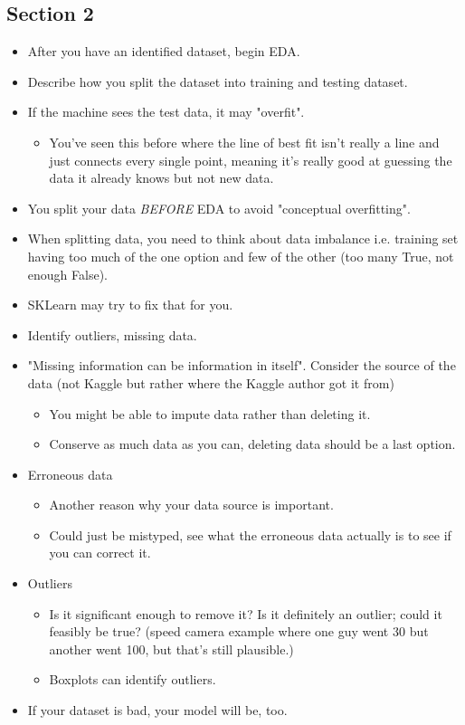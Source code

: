 \documentclass[12pt]{report}
\begin{document}
\subsection{Section 2}
\begin{itemize}
    \item After you have an identified dataset, begin EDA.
    \item Describe how you split the dataset into training and testing dataset.
    \item If the machine sees the test data, it may "overfit". \begin{itemize}
        \item You've seen this before where the line of best fit isn't really a line and just connects every single point, meaning it's 
        really good at guessing the data it already knows but not new data. 
    \end{itemize}
    \item You split your data \textit{BEFORE} EDA to avoid "conceptual overfitting".
    \item When splitting data, you need to think about data imbalance i.e. training set having too much of the one option and few of the other (too many True, not enough False).
    \item SKLearn may try to fix that for you.
    \item Identify outliers, missing data.
    \item "Missing information can be information in itself". Consider the source of the data (not Kaggle but rather where the Kaggle author got it from)
    \begin{itemize}
        \item You might be able to impute data rather than deleting it.
        \item Conserve as much data as you can, deleting data should be a last option.
    \end{itemize}
    \item Erroneous data \begin{itemize}
        \item Another reason why your data source is important.
        \item Could just be mistyped, see what the erroneous data actually is to see if you can correct it.
    \end{itemize}
    \item Outliers
    \begin{itemize}
        \item Is it significant enough to remove it? Is it definitely an outlier; could it feasibly be true? (speed camera example where one guy went 30 but another went 100, but that's still plausible.)
        \item Boxplots can identify outliers.
    \end{itemize}
    \item If your dataset is bad, your model will be, too.
\end{itemize}
\end{document}
